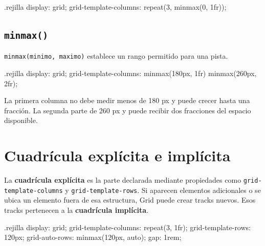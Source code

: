 \documentclass[11pt]{article}
\begin{document}

\begin{csscodedark}
.rejilla {
    display: grid;
    grid-template-columns: repeat(3, minmax(0, 1fr));
}
\end{csscodedark}

\subsection{\texttt{minmax()}}

\texttt{minmax(minimo, maximo)} establece un rango permitido para una pista.

\begin{csscodedark}
.rejilla {
    display: grid;
    grid-template-columns:
        minmax(180px, 1fr)
        minmax(260px, 2fr);
}
\end{csscodedark}

La primera columna no debe medir menos de 180 px y puede crecer hasta una
fracción. La segunda parte de 260 px y puede recibir dos fracciones del espacio
disponible.


\section{Cuadrícula explícita e implícita}

La \textbf{cuadrícula explícita} es la parte declarada mediante propiedades como
\texttt{grid-template-columns} y \texttt{grid-template-rows}. Si aparecen
elementos adicionales o se ubica un elemento fuera de esa estructura, Grid puede
crear tracks nuevos. Esos tracks pertenecen a la \textbf{cuadrícula implícita}.

\begin{csscodedark}
.rejilla {
    display: grid;
    grid-template-columns: repeat(3, 1fr);
    grid-template-rows: 120px;
    grid-auto-rows: minmax(120px, auto);
    gap: 1rem;
}
\end{csscodedark}
\end{document}
